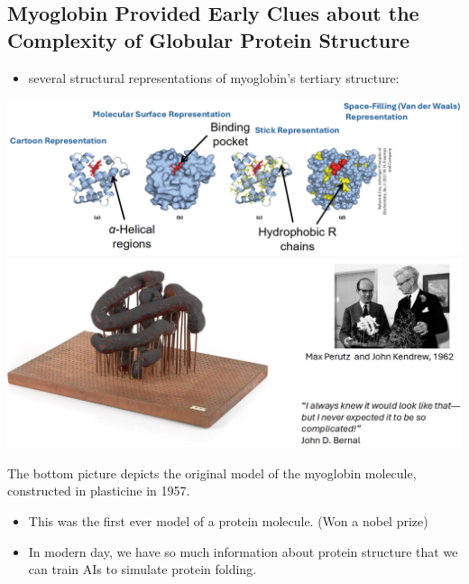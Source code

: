 \documentclass[10pt]{article}
\begin{document}
\subsection*{Myoglobin Provided Early Clues about the Complexity of Globular Protein Structure}
\begin{itemize}
    \item several structural representations of myoglobin's tertiary structure:
\end{itemize}
\begin{center}
    \includegraphics*[width=\textwidth]{L1_3.png}
    \includegraphics*[width=\textwidth]{L1_4.png}
\end{center}
The bottom picture depicts the original model of the myoglobin molecule, constructed in plasticine in 1957.
\begin{itemize}
    \item This was the first ever model of a protein molecule.  (Won a nobel prize)
    \item In modern day, we have so much information about protein structure that we can train AIs to simulate protein folding.
\end{itemize}
\end{document}
